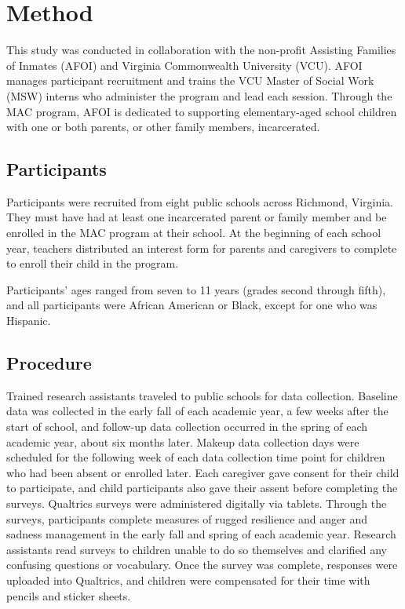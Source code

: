 \section{Method}
This study was conducted in collaboration with the non-profit Assisting Families of Inmates (AFOI) and Virginia Commonwealth University (VCU). AFOI manages participant recruitment and trains the VCU Master of Social Work (MSW) interns who administer the program and lead each session. Through the MAC program, AFOI is dedicated to supporting elementary-aged school children with one or both parents, or other family members, incarcerated. 

\subsection{Participants}

Participants were recruited from eight public schools across Richmond, Virginia. They must have had at least one incarcerated parent or family member and be enrolled in the MAC program at their school. At the beginning of each school year, teachers distributed an interest form for parents and caregivers to complete to enroll their child in the program.

Participants' ages ranged from seven to 11 years (grades second through fifth), and all participants were African American or Black, except for one who was Hispanic. 

\subsection{Procedure}

Trained research assistants traveled to public schools for data collection. Baseline data was collected in the early fall of each academic year, a few weeks after the start of school, and follow-up data collection occurred in the spring of each academic year, about six months later. Makeup data collection days were scheduled for the following week of each data collection time point for children who had been absent or enrolled later. Each caregiver gave consent for their child to participate, and child participants also gave their assent before completing the surveys.
Qualtrics surveys were administered digitally via tablets. Through the surveys, participants complete measures of rugged resilience and anger and sadness management in the early fall and spring of each academic year. Research assistants read surveys to children unable to do so themselves and clarified any confusing questions or vocabulary. Once the survey was complete, responses were uploaded into Qualtrics, and children were compensated for their time with pencils and sticker sheets.